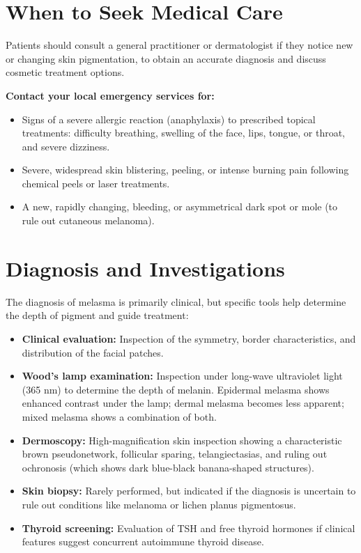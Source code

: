 \section*{When to Seek Medical Care}
Patients should consult a general practitioner or dermatologist if they notice new or changing skin pigmentation, to obtain an accurate diagnosis and discuss cosmetic treatment options.

\textbf{Contact your local emergency services for:}
\begin{itemize}
    \item Signs of a severe allergic reaction (anaphylaxis) to prescribed topical treatments: difficulty breathing, swelling of the face, lips, tongue, or throat, and severe dizziness.
    \item Severe, widespread skin blistering, peeling, or intense burning pain following chemical peels or laser treatments.
    \item A new, rapidly changing, bleeding, or asymmetrical dark spot or mole (to rule out cutaneous melanoma).
\end{itemize}

\section*{Diagnosis and Investigations}
The diagnosis of melasma is primarily clinical, but specific tools help determine the depth of pigment and guide treatment:
\begin{itemize}
    \item \textbf{Clinical evaluation:} Inspection of the symmetry, border characteristics, and distribution of the facial patches.
    \item \textbf{Wood's lamp examination:} Inspection under long-wave ultraviolet light (365 nm) to determine the depth of melanin. Epidermal melasma shows enhanced contrast under the lamp; dermal melasma becomes less apparent; mixed melasma shows a combination of both.
    \item \textbf{Dermoscopy:} High-magnification skin inspection showing a characteristic brown pseudonetwork, follicular sparing, telangiectasias, and ruling out ochronosis (which shows dark blue-black banana-shaped structures).
    \item \textbf{Skin biopsy:} Rarely performed, but indicated if the diagnosis is uncertain to rule out conditions like melanoma or lichen planus pigmentosus.
    \item \textbf{Thyroid screening:} Evaluation of TSH and free thyroid hormones if clinical features suggest concurrent autoimmune thyroid disease.
\end{itemize}

